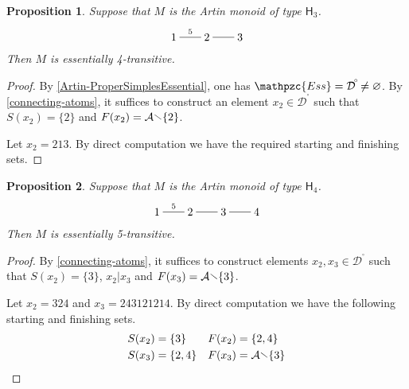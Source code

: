 \documentclass[a4paper,final]{article}
\let\emptyset\varnothing
\theoremstyle{plain}
\newtheorem{proposition}[proposition]{Proposition}
\theoremstyle{remark}
\theoremstyle{definition}
\begin{document}
\begin{proposition}
  Suppose that $M$ is the Artin monoid of type ${\mathsf{{H}}}_3$.
  \[
    \begin{xy}
      0;<3em,0em>:<0em,3em>::
      
      (0,0)*+{1}="1";
      (1,0)*+{2}="2";
      (2,0)*+{3}="3";
      
      {\ar@{-}^{5}  "1";"2"};
      {\ar@{-}     "2";"3"};
    \end{xy}
  \]
  Then $M$ is essentially 4-transitive.
\end{proposition}
\begin{proof}
  By \autoref{Artin-ProperSimplesEssential}, one has ${\mathpzc{Ess}}={{\mathcal{D}}^{\!{}^{\circ}\!}}\neq\emptyset$.
  By \autoref{connecting-atoms}, it suffices to construct an element
  $x_2 \in {{\mathcal{D}}^{\!{}^{\circ}\!}}$ such that ${S}(x_2) = \{2\}$ and ${F}(x_2) =
  {\mathcal{A}} {\mathbin{\raisebox{0.25ex}{$\smallsetminus$}}} \{2\}$.

  Let $x_2 = 213$.  By direct computation we have the required
  starting and finishing sets.
\end{proof}

\begin{proposition}
  Suppose that $M$ is the Artin monoid of type ${\mathsf{{H}}}_4$.
  \[
    \begin{xy}
      0;<3em,0em>:<0em,3em>::
      
      (0,0)*+{1}="1";
      (1,0)*+{2}="2";
      (2,0)*+{3}="3";
      (3,0)*+{4}="4";
      
      {\ar@{-}^{5}  "1";"2"};
      {\ar@{-}     "2";"3"};
      {\ar@{-}     "3";"4"};
    \end{xy}
  \]
  Then $M$ is essentially 5-transitive.
\end{proposition}
\begin{proof}
  By \autoref{connecting-atoms}, it suffices to construct elements
  $x_2, x_3 \in {{\mathcal{D}}^{\!{}^{\circ}\!}}$ such that ${S}(x_2) = \{3\}$, $x_2 |
  x_3$ and ${F}(x_3) = {\mathcal{A}} {\mathbin{\raisebox{0.25ex}{$\smallsetminus$}}} \{3\}$.

  Let $x_2 = 324$ and $x_3 = 243121214$.  By direct
  computation we have the following starting and finishing sets.
  \begin{align*}
    {S}(x_2) &= \{ 3 \} &
    {F}(x_2) &= \{ 2, 4 \} \\
    {S}(x_3) &= \{ 2, 4 \} &
    {F}(x_3) &= {\mathcal{A}}{\mathbin{\raisebox{0.25ex}{$\smallsetminus$}}}\{ 3 \}
  \end{align*}
\end{proof}
\end{document}
